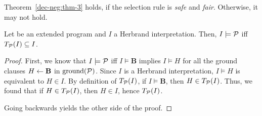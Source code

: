 \begin{rem}
    Theorem~\ref{dec-neg:thm-3} holds, if the selection rule is \emph{safe} and \emph{fair}. Otherwise, it may not hold.
\end{rem}

\begin{lem}
    Let \prog be an extended program and \(I\) a Herbrand interpretation.
    Then, \(I \models \mathcal{P}\) iff \(T_\mathcal{P}(I) \subseteq I\).
\end{lem}
\begin{proof}
    First, we know that \(I \models \mathcal{P}\) iff \(I \models \mathbf{B}\) implies \(I \models H\) for all the ground clauses \(H \leftarrow \mathbf{B}\) in \(\operatorname{ground}(\mathcal{P})\).
    Since \(I\) is a Herbrand interpretation, \(I \models H\) is equivalent to \(H \in I\).
    By definition of \(T_\mathcal{P}(I)\), if \(I \models \mathbf{B}\), then \(H \in T_\mathcal{P}(I)\).
    Thus, we found that if \(H \in T_\mathcal{P}(I)\), then \(H \in I\), hence \(T_\mathcal{P}(I)\).

    Going backwards yields the other side of the proof.
\end{proof}